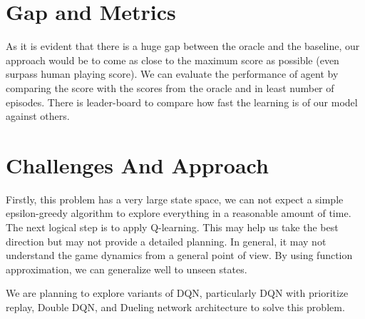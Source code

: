\documentclass[12pt]{article}
\begin{document}
\section{Gap and Metrics}

As it is evident that there is a huge gap between the oracle and the baseline, our approach would be to come as close to the maximum score as possible (even surpass human playing score). We can evaluate the performance of agent by comparing the score with the scores from the oracle and in least number of episodes. There is leader-board to compare how fast the learning is of our model against others.\citep{leaderboard}

\section{Challenges And Approach}

Firstly, this problem has a very large state space, we can not expect a simple epsilon-greedy algorithm to explore everything in a reasonable amount of time. The next logical step is to apply Q-learning. This may help us take the best direction but may not provide a detailed planning. In general, it may not understand the game dynamics from a general point of view. By using function approximation, we can generalize well to unseen states.

We are planning to explore variants of DQN, particularly DQN with prioritize replay\citep{PrioritizedReplay}, Double DQN\citep{DoubleQ-learning}, and Dueling network architecture\citep{Dueling} to solve this problem.



\end{document}
